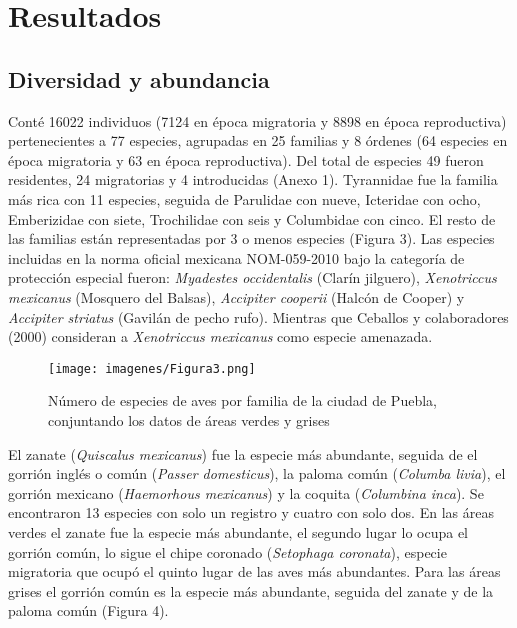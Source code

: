 \documentclass[letterpaper,12pt]{article}
\begin{document}
\section{Resultados}
\subsection{Diversidad y abundancia}
Conté 16022 individuos (7124 en época migratoria y  8898 en época reproductiva) pertenecientes a 77 especies, agrupadas  en 25 familias y 8 órdenes (64 especies en época migratoria y 63 en época reproductiva). Del total de especies  49 fueron residentes, 24 migratorias y 4 introducidas (Anexo 1). Tyrannidae fue la familia  más rica  con 11 especies, seguida de Parulidae con nueve, Icteridae con ocho, Emberizidae con siete, Trochilidae con seis y Columbidae con cinco. El resto de las familias están representadas por 3 o menos especies (Figura 3). Las especies incluidas en la norma oficial mexicana NOM-059-2010 bajo la categoría de protección especial fueron: \textit{Myadestes occidentalis} (Clarín jilguero), \textit{Xenotriccus mexicanus} (Mosquero del Balsas), \textit{Accipiter cooperii} (Halcón de Cooper) y \textit{Accipiter striatus} (Gavilán de pecho rufo). Mientras que Ceballos y colaboradores (2000) consideran a \textit{Xenotriccus mexicanus} como especie amenazada.
\begin{center}
\begin{figure}[H]
\texttt{[image: imagenes/Figura3.png]}\\
\caption[Número de especies por familia.]{ Número de especies de aves por familia de la ciudad de Puebla, conjuntando los datos de áreas verdes y grises} 
\end{figure}
\end{center}

El zanate (\textit{Quiscalus mexicanus}) fue la especie más abundante, seguida de el gorrión inglés o común (\textit{Passer domesticus}), la paloma común (\textit{Columba livia}), el gorrión mexicano (\textit{Haemorhous mexicanus}) y la coquita (\textit{Columbina inca}). Se encontraron 13 especies  con solo un registro  y cuatro con solo dos. En las áreas verdes el zanate fue  la especie más abundante, el segundo lugar lo ocupa el gorrión común, lo sigue el chipe coronado (\textit{Setophaga  coronata}), especie migratoria que ocupó el quinto lugar de las aves más abundantes. Para las áreas grises el gorrión común es la especie más abundante, seguida del zanate y de la paloma común (Figura 4).
\end{document}
